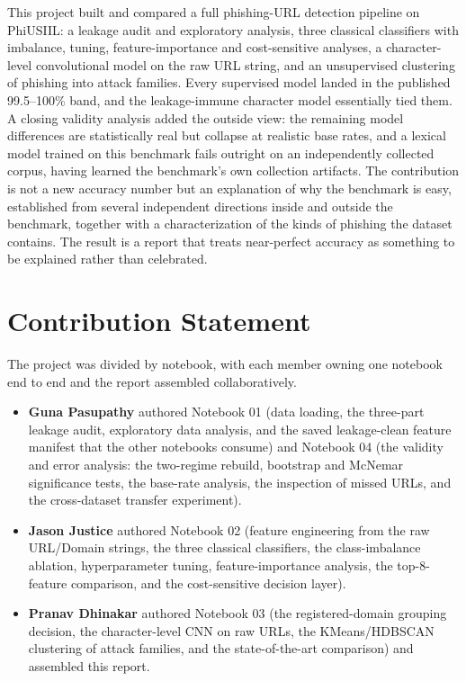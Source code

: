 \documentclass[stu,12pt,floatsintext]{apa7}
\begin{document}
This project built and compared a full phishing-URL detection pipeline on
PhiUSIIL: a leakage audit and exploratory analysis, three classical
classifiers with imbalance, tuning, feature-importance and cost-sensitive
analyses, a character-level convolutional model on the raw URL string, and
an unsupervised clustering of phishing into attack families. Every
supervised model landed in the published 99.5--100\% band, and the
leakage-immune character model essentially tied them. A closing validity
analysis added the outside view: the remaining model differences are
statistically real but collapse at realistic base rates, and a lexical
model trained on this benchmark fails outright on an independently
collected corpus, having learned the benchmark's own collection
artifacts. The contribution is not a new accuracy number but an
explanation of why the benchmark is easy, established from several
independent directions inside and outside the benchmark, together with a
characterization of the kinds of phishing the dataset contains. The result
is a report that treats near-perfect accuracy as something to be
explained rather than celebrated.

\printbibliography

\appendix

\section{Contribution Statement}

The project was divided by notebook, with each member owning one notebook
end to end and the report assembled collaboratively.

\begin{itemize}
  \item \textbf{Guna Pasupathy} authored Notebook 01 (data loading, the
    three-part leakage audit, exploratory data analysis, and the saved
    leakage-clean feature manifest that the other notebooks consume) and
    Notebook 04 (the validity and error analysis: the two-regime rebuild,
    bootstrap and McNemar significance tests, the base-rate analysis,
    the inspection of missed URLs, and the cross-dataset transfer
    experiment).
  \item \textbf{Jason Justice} authored Notebook 02 (feature engineering
    from the raw URL/Domain strings, the three classical classifiers, the
    class-imbalance ablation, hyperparameter tuning, feature-importance
    analysis, the top-8-feature comparison, and the cost-sensitive
    decision layer).
  \item \textbf{Pranav Dhinakar} authored Notebook 03 (the
    registered-domain grouping decision, the character-level CNN on raw
    URLs, the KMeans/HDBSCAN clustering of attack families, and the
    state-of-the-art comparison) and assembled this report.
\end{itemize}
\end{document}
